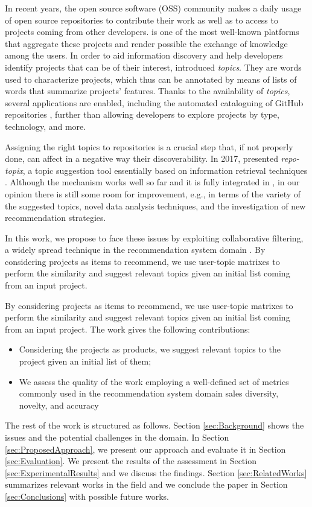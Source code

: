 In recent years, the open source software (OSS) community 
makes a daily usage of open source repositories to 
contribute their work as well as to access to projects 
coming from other developers. \GH is one of the most 
well-known platforms that aggregate these projects and 
render possible the exchange of knowledge among the users.
%
In order to aid information discovery and help 
developers identify projects that can be of their interest, \GH introduced \emph{topics}. They are 
words used to characterize projects, which thus can be 
annotated by means of lists of words that summarize projects' features. Thanks 
to the availability of \emph{topics}, several applications are enabled, 
including the automated cataloguing of GitHub repositories \cite{davidlo1}, 
further than allowing developers to explore projects by type, technology, and 
more.

Assigning the right topics to \GH repositories is a crucial step that, if not 
properly done, can affect in a negative way their discoverability. In 
2017, \GH presented \textit{repo-topix}, a topic suggestion tool essentially 
based on information retrieval techniques \cite{noauthor_topic_nodate}. 
Although the mechanism works well so far and it is fully integrated in \GH, in our 
opinion there is still some room for improvement, e.g., in terms of the variety 
of the suggested topics, novel data analysis techniques, and the investigation of new recommendation strategies.

In this work, we propose to face these issues by exploiting collaborative filtering, a widely spread technique in the recommendation system domain \cite{Schafer:2007:CFR:1768197.1768208}. By considering \GH projects as items to recommend,  we use user-topic matrixes to perform the similarity and suggest relevant topics given an initial list coming from an input project. 

By considering \GH projects as items to recommend,  we use user-topic matrixes to perform the similarity and suggest relevant topics given an initial list coming from an input project. 
The work gives the following contributions:
\begin{itemize}
\item Considering the \GH projects as products, we suggest relevant topics to the project given an initial list of them;
\item We assess the quality of the work employing a well-defined set of metrics commonly used in the recommendation system domain \ie sales diversity, novelty, and accuracy
\end{itemize}

The rest of the work is structured as follows. Section \ref{sec:Background} shows the issues and the potential challenges in the domain. In Section \ref{sec:ProposedApproach}, we present our approach and evaluate it in Section \ref{sec:Evaluation}. We present the results of the assessment in Section \ref{sec:ExperimentalResults} and we discuss the findings. Section \ref{sec:RelatedWorks} summarizes relevant works in the field and we conclude the paper in Section \ref{sec:Conclusions} with possible future works.
